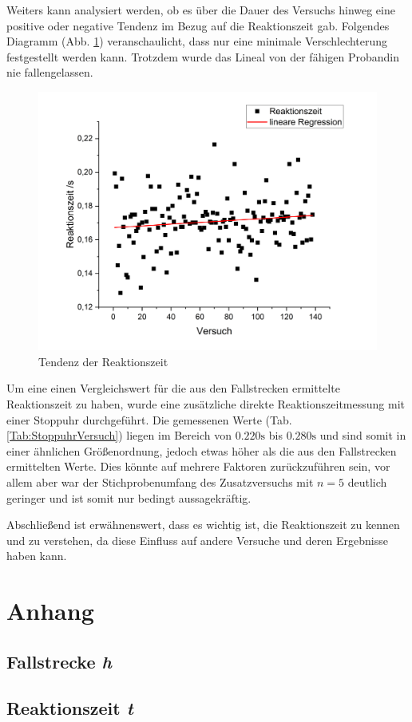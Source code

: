 \documentclass[a4paper,12pt]{article}
\begin{document}
Weiters kann analysiert werden, ob es über die Dauer des Versuchs hinweg eine positive oder negative Tendenz im
Bezug auf die Reaktionszeit gab. Folgendes Diagramm (Abb. \ref{Abb:ReaktionszeitTendenz}) veranschaulicht, dass nur eine minimale Verschlechterung
festgestellt werden kann. Trotzdem wurde das Lineal von der fähigen Probandin nie fallengelassen.

\begin{figure}[H]
    \centering
    \includegraphics[width=13cm]{bilder/Tendenz1.png}          %
    \caption{Tendenz der Reaktionszeit}
    \label{Abb:ReaktionszeitTendenz}
\end{figure}

Um eine einen Vergleichswert für die aus den Fallstrecken ermittelte Reaktionszeit zu haben, wurde
eine zusätzliche direkte Reaktionszeitmessung mit einer Stoppuhr durchgeführt. Die gemessenen Werte
(Tab. \ref{Tab:StoppuhrVersuch}) liegen im Bereich von $0.220\mathrm{s}$ bis $0.280\mathrm{s}$ und
sind somit in einer ähnlichen Größenordnung, jedoch etwas höher als die aus den Fallstrecken ermittelten
Werte. Dies könnte auf mehrere Faktoren zurückzuführen sein, vor allem aber war der Stichprobenumfang
des Zusatzversuchs mit $n=5$ deutlich geringer und ist somit nur bedingt aussagekräftig.

Abschließend ist erwähnenswert, dass es wichtig ist, die Reaktionszeit zu kennen und zu verstehen,
da diese Einfluss auf andere Versuche und deren Ergebnisse haben kann.



\newpage
\section{Anhang}
\subsection{Fallstrecke \textit{h}}
\label{AnahangFallstrecke}




\newpage
\subsection{Reaktionszeit \textit{t}}
\label{AnahangReaktionszeit}


\end{document}
